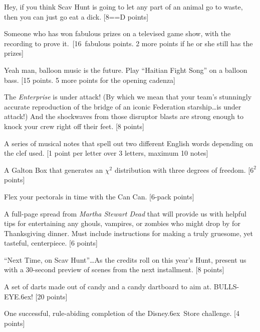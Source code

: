 \documentclass{book}
\def\tr{\raise.6ex\hbox{\scriptsize \textregistered}}
\begin{document}
\begin{list}{}{}
\item Hey, if you think Scav Hunt is going to let any part of an animal go to waste, then you can just go eat a dick. [8==D points]

\item Someone who has won fabulous prizes on a televised game show, with the recording to prove it.\ [16~fabulous points. 2 more points if he or she still has the prizes] 

\item Yeah man, balloon music is the future. Play ``Haitian Fight Song'' on a balloon bass. [15 points. 5 more points for the opening cadenza] 

\item The \emph{Enterprise} is under attack! (By which we mean that your team's stunningly accurate reproduction of the bridge of an iconic Federation starship\ldots is under attack!) And the shockwaves from those disruptor blasts are strong enough to knock your crew right off their feet.  [8 points]

\item A series of musical notes that spell out two different English words depending on the clef used. [1 point per letter over 3 letters, maximum 10 notes]

\item A Galton Box that generates an $\chi^2$ distribution with three degrees of freedom. [$6^2$ points]

\item Flex your pectorals in time with the Can Can. [6-pack points]

\item A full-page spread from \emph{Martha Stewart Dead} that will provide us with helpful tips for entertaining any ghouls, vampires, or zombies who might drop by for Thanksgiving dinner. Must include instructions for making a truly gruesome, yet tasteful, centerpiece. [6 points]

\item ``Next Time, on Scav Hunt''\ldots As the credits roll on this year's Hunt, present us with a 30-second preview of scenes from the next installment. [8 points]


\newpage




\item A set of darts made out of candy and a candy dartboard to aim at.  BULLS-EYE\tr! [20 points]

\item One successful, rule-abiding completion of the Disney\tr\ Store challenge. [4 points]


\end{list}
\end{document}
